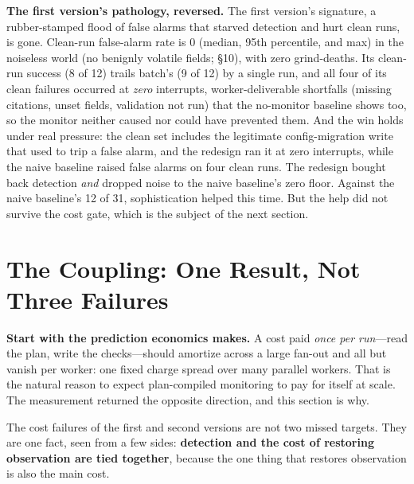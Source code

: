 \documentclass[acmsmall,screen]{acmart}
\begin{document}
\textbf{The first version's pathology, reversed.} The first version's
signature, a rubber-stamped flood of false alarms that starved detection and
hurt clean runs, is gone. Clean-run false-alarm rate is 0 (median, 95th
percentile, and max) in the noiseless world (no benignly volatile fields; \S10),
with zero grind-deaths. Its clean-run success (8 of 12)
trails batch's (9 of 12) by a single run, and all four of its clean failures
occurred at \emph{zero} interrupts, worker-deliverable shortfalls (missing
citations, unset fields, validation not run) that the no-monitor baseline shows
too, so the monitor neither caused nor could have prevented them. And the win
holds under real
pressure: the clean set includes the legitimate config-migration write that used
to trip a false alarm, and the redesign ran it at zero interrupts, while the
naive baseline raised false alarms on four clean runs. The redesign bought back
detection \emph{and} dropped noise to the naive baseline's zero floor. Against
the naive baseline's 12 of 31, sophistication helped this time. But the help did
not survive the cost gate, which is the subject of the next section.

\section{The Coupling: One Result, Not Three Failures}
\textbf{Start with the prediction economics makes.} A cost paid \emph{once per
run}---read the plan, write the checks---should amortize across a large fan-out
and all but vanish per worker: one fixed charge spread over many parallel
workers. That is the natural reason to expect plan-compiled monitoring to pay for
itself at scale. The measurement returned the opposite direction, and this
section is why.

The cost failures of the first and second versions are not two missed targets.
They are one fact, seen from a few sides: \textbf{detection and the cost of
restoring observation are tied together}, because the one thing that restores
observation is also the main cost.
\end{document}
